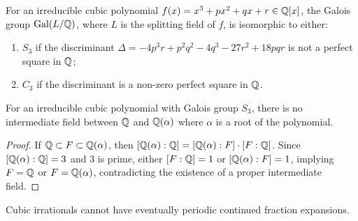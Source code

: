 \begin{theorem}\label{thm:cubic_galois}
For an irreducible cubic polynomial $f(x) = x^3 + px^2 + qx + r \in \mathbb{Q}[x]$, the Galois group $\operatorname{Gal}(L/\mathbb{Q})$, where $L$ is the splitting field of $f$, is isomorphic to either:
\begin{enumerate}
    \item $S_3$ if the discriminant $\Delta = -4p^3r + p^2q^2 - 4q^3 - 27r^2 + 18pqr$ is not a perfect square in $\mathbb{Q}$;
    \item $C_3$ if the discriminant is a non-zero perfect square in $\mathbb{Q}$.
\end{enumerate}
\end{theorem}

\begin{proposition}\label{prop:no_intermediate_field}
For an irreducible cubic polynomial with Galois group $S_3$, there is no intermediate field between $\mathbb{Q}$ and $\mathbb{Q}(\alpha)$ where $\alpha$ is a root of the polynomial.
\end{proposition}

\begin{proof}
If $\mathbb{Q} \subset F \subset \mathbb{Q}(\alpha)$, then $[\mathbb{Q}(\alpha):\mathbb{Q}] = [\mathbb{Q}(\alpha):F] \cdot [F:\mathbb{Q}]$. Since $[\mathbb{Q}(\alpha):\mathbb{Q}] = 3$ and 3 is prime, either $[F:\mathbb{Q}] = 1$ or $[\mathbb{Q}(\alpha):F] = 1$, implying $F = \mathbb{Q}$ or $F = \mathbb{Q}(\alpha)$, contradicting the existence of a proper intermediate field.
\end{proof}

\begin{theorem}\label{thm:non_periodicity}
Cubic irrationals cannot have eventually periodic continued fraction expansions.
\end{theorem}

